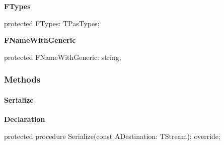 \documentclass{report}
\newif\ifpdf
\begin{document}
\begin{list}{}
\begin{flushleft}
\ifpdf
\end{flushleft}
\fi


\par  \label{PasDoc_Items.TPasCio-FTypes}
\item[\textbf{FTypes}\hfill]
\ifpdf
\begin{flushleft}
\fi
\begin{ttfamily}
protected FTypes: TPasTypes;\end{ttfamily}

\ifpdf
\end{flushleft}
\fi


\par  \label{PasDoc_Items.TPasCio-FNameWithGeneric}
\item[\textbf{FNameWithGeneric}\hfill]
\ifpdf
\begin{flushleft}
\fi
\begin{ttfamily}
protected FNameWithGeneric: string;\end{ttfamily}

\ifpdf
\end{flushleft}
\fi


\par  \end{list}
\subsubsection*{\large{\textbf{Methods}}\normalsize\hspace{1ex}\hfill}
\paragraph*{Serialize}\hspace*{\fill}

\label{PasDoc_Items.TPasCio-Serialize}
\begin{list}{}{
\setlength{\itemindent}{0cm}
\setlength{\listparindent}{0cm}
\setlength{\leftmargin}{\evensidemargin}
\addtolength{\leftmargin}{\tmplength}
\settowidth{\labelsep}{X}
\addtolength{\leftmargin}{\labelsep}
\setlength{\labelwidth}{\tmplength}
}
\item[\textbf{Declaration}\hfill]
\ifpdf
\begin{flushleft}
\fi
\begin{ttfamily}
protected procedure Serialize(const ADestination: TStream); override;\end{ttfamily}

\ifpdf
\end{flushleft}
\fi

\end{list}
\end{document}
